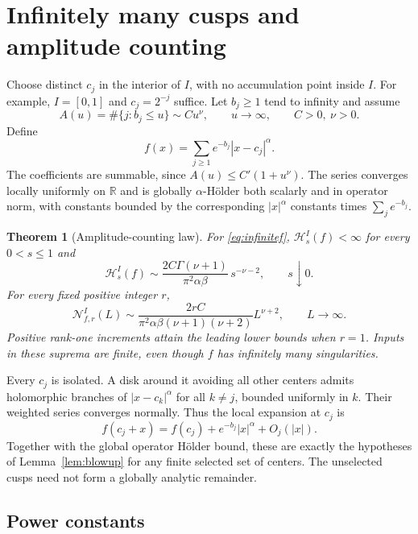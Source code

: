 \documentclass[11pt]{article}
\newtheorem{theorem}{Theorem}[section]
\numberwithin{equation}{section}
\newcommand{\R}{\mathbb R}
\newcommand{\cH}{\mathcal H}
\newcommand{\cN}{\mathcal N}
\begin{document}
\section{Infinitely many cusps and amplitude counting}

Choose distinct $c_j$ in the interior of $I$, with no accumulation
point inside $I$. For example, $I=[0,1]$ and $c_j=2^{-j}$ suffice.
Let $b_j\ge1$ tend to infinity and assume
\begin{equation}\label{eq:amplitudecount}
 A(u)=\#\{j:b_j\le u\}\sim C u^\nu,
 \qquad u\to\infty,\qquad C>0,\ \nu>0.
\end{equation}
Define
\begin{equation}\label{eq:infinitef}
 f(x)=\sum_{j\ge1}e^{-b_j}|x-c_j|^\alpha.
\end{equation}
The coefficients are summable, since $A(u)\le C'(1+u^\nu)$.
The series converges locally uniformly on $\R$ and is globally
$\alpha$-H\"older both scalarly and in operator norm, with constants
bounded by the corresponding $|x|^\alpha$ constants times
$\sum_je^{-b_j}$.

\begin{theorem}[Amplitude-counting law]\label{thm:infinite}
For \eqref{eq:infinitef}, $\cH_s^I(f)<\infty$ for every $0<s\le1$ and
\begin{equation}\label{eq:infiniteH}
 \cH_s^I(f)\sim
 \frac{2C\Gamma(\nu+1)}{\pi^2\alpha\beta}\,s^{-\nu-2},
 \qquad s\downarrow0.
\end{equation}
For every fixed positive integer $r$,
\begin{equation}\label{eq:infiniteN}
 \cN_{f,r}^I(L)\sim
 \frac{2rC}{\pi^2\alpha\beta(\nu+1)(\nu+2)}L^{\nu+2},
 \qquad L\to\infty.
\end{equation}
Positive rank-one increments attain the leading lower bounds when
$r=1$. Inputs in these suprema are finite, even though $f$ has
infinitely many singularities.
\end{theorem}

Every $c_j$ is isolated. A disk around it avoiding all other centers
admits holomorphic branches of $|x-c_k|^\alpha$ for all $k\ne j$,
bounded uniformly in $k$. Their weighted series converges normally.
Thus the local expansion at $c_j$ is
\[
 f(c_j+x)=f(c_j)+e^{-b_j}|x|^\alpha+O_j(|x|).
\]
Together with the global operator H\"older bound, these are exactly the
hypotheses of Lemma~\ref{lem:blowup} for any finite selected set of
centers. The unselected cusps need not form a globally analytic remainder.

\subsection{Power constants}
\end{document}

